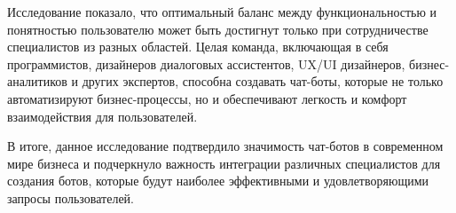 \documentclass{article}
\begin{document}
Исследование показало, что оптимальный баланс между функциональностью и понятностью пользователю может быть достигнут только при сотрудничестве специалистов из разных областей. Целая команда, включающая в себя программистов, дизайнеров диалоговых ассистентов, UX/UI дизайнеров, бизнес-аналитиков и других экспертов, способна создавать чат-боты, которые не только автоматизируют бизнес-процессы, но и обеспечивают легкость и комфорт взаимодействия для пользователей.

В итоге, данное исследование подтвердило значимость чат-ботов в современном мире бизнеса и подчеркнуло важность интеграции различных специалистов для создания ботов, которые будут наиболее эффективными и удовлетворяющими запросы пользователей.



\end{document}
